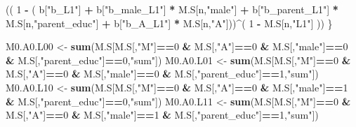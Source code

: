 \documentclass[
]{book}
\newenvironment{Shaded}{\begin{snugshade}}{\end{snugshade}}
\newcommand{\DecValTok}[1]{\textcolor[rgb]{0.00,0.00,0.81}{#1}}
\newcommand{\FunctionTok}[1]{\textcolor[rgb]{0.13,0.29,0.53}{\textbf{#1}}}
\newcommand{\NormalTok}[1]{#1}
\newcommand{\OtherTok}[1]{\textcolor[rgb]{0.56,0.35,0.01}{#1}}
\newcommand{\SpecialCharTok}[1]{\textcolor[rgb]{0.81,0.36,0.00}{\textbf{#1}}}
\newcommand{\StringTok}[1]{\textcolor[rgb]{0.31,0.60,0.02}{#1}}
\begin{document}
\begin{Shaded}
\begin{Highlighting}[]
\NormalTok{      (( }\DecValTok{1} \SpecialCharTok{{-}}\NormalTok{ ( b[}\StringTok{"b\_L1"}\NormalTok{] }\SpecialCharTok{+}
\NormalTok{                 b[}\StringTok{"b\_male\_L1"}\NormalTok{] }\SpecialCharTok{*}\NormalTok{ M.S[n,}\StringTok{"male"}\NormalTok{] }\SpecialCharTok{+}  
\NormalTok{                 b[}\StringTok{"b\_parent\_L1"}\NormalTok{] }\SpecialCharTok{*}\NormalTok{ M.S[n,}\StringTok{"parent\_educ"}\NormalTok{] }\SpecialCharTok{+}
\NormalTok{                 b[}\StringTok{"b\_A\_L1"}\NormalTok{] }\SpecialCharTok{*}\NormalTok{ M.S[n,}\StringTok{"A"}\NormalTok{]))}\SpecialCharTok{\^{}}\NormalTok{( }\DecValTok{1} \SpecialCharTok{{-}}\NormalTok{ M.S[n,}\StringTok{"L1"}\NormalTok{] )) }
\NormalTok{    \}}
  
\NormalTok{  M0.A0.L00 }\OtherTok{\textless{}{-}} \FunctionTok{sum}\NormalTok{(M.S[M.S[,}\StringTok{"M"}\NormalTok{]}\SpecialCharTok{==}\DecValTok{0} \SpecialCharTok{\&}\NormalTok{ M.S[,}\StringTok{"A"}\NormalTok{]}\SpecialCharTok{==}\DecValTok{0} \SpecialCharTok{\&}\NormalTok{ M.S[,}\StringTok{"male"}\NormalTok{]}\SpecialCharTok{==}\DecValTok{0} \SpecialCharTok{\&} 
\NormalTok{                         M.S[,}\StringTok{"parent\_educ"}\NormalTok{]}\SpecialCharTok{==}\DecValTok{0}\NormalTok{,}\StringTok{"sum"}\NormalTok{])}
\NormalTok{  M0.A0.L01 }\OtherTok{\textless{}{-}} \FunctionTok{sum}\NormalTok{(M.S[M.S[,}\StringTok{"M"}\NormalTok{]}\SpecialCharTok{==}\DecValTok{0} \SpecialCharTok{\&}\NormalTok{ M.S[,}\StringTok{"A"}\NormalTok{]}\SpecialCharTok{==}\DecValTok{0} \SpecialCharTok{\&}\NormalTok{ M.S[,}\StringTok{"male"}\NormalTok{]}\SpecialCharTok{==}\DecValTok{0} \SpecialCharTok{\&} 
\NormalTok{                         M.S[,}\StringTok{"parent\_educ"}\NormalTok{]}\SpecialCharTok{==}\DecValTok{1}\NormalTok{,}\StringTok{"sum"}\NormalTok{])}
\NormalTok{  M0.A0.L10 }\OtherTok{\textless{}{-}} \FunctionTok{sum}\NormalTok{(M.S[M.S[,}\StringTok{"M"}\NormalTok{]}\SpecialCharTok{==}\DecValTok{0} \SpecialCharTok{\&}\NormalTok{ M.S[,}\StringTok{"A"}\NormalTok{]}\SpecialCharTok{==}\DecValTok{0} \SpecialCharTok{\&}\NormalTok{ M.S[,}\StringTok{"male"}\NormalTok{]}\SpecialCharTok{==}\DecValTok{1} \SpecialCharTok{\&} 
\NormalTok{                         M.S[,}\StringTok{"parent\_educ"}\NormalTok{]}\SpecialCharTok{==}\DecValTok{0}\NormalTok{,}\StringTok{"sum"}\NormalTok{])}
\NormalTok{  M0.A0.L11 }\OtherTok{\textless{}{-}} \FunctionTok{sum}\NormalTok{(M.S[M.S[,}\StringTok{"M"}\NormalTok{]}\SpecialCharTok{==}\DecValTok{0} \SpecialCharTok{\&}\NormalTok{ M.S[,}\StringTok{"A"}\NormalTok{]}\SpecialCharTok{==}\DecValTok{0} \SpecialCharTok{\&}\NormalTok{ M.S[,}\StringTok{"male"}\NormalTok{]}\SpecialCharTok{==}\DecValTok{1} \SpecialCharTok{\&} 
\NormalTok{                         M.S[,}\StringTok{"parent\_educ"}\NormalTok{]}\SpecialCharTok{==}\DecValTok{1}\NormalTok{,}\StringTok{"sum"}\NormalTok{])}
  

\end{Highlighting}
\end{Shaded}
\end{document}
